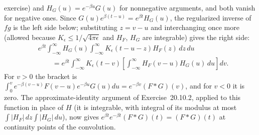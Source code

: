 exercise) and $H_G(u)=e^{-\beta u}G(u)$ for nonnegative
arguments, and both vanish for negative ones. Since
$G(u)e^{\beta(t-u)}=e^{\beta t}H_G(u)$, the regularized inverse
of $fg$ is the left side below; substituting $z=v-u$ and
interchanging once more (allowed because
$K_\epsilon\le1/\sqrt{4\pi\epsilon}$ and $H_F$, $H_G$ are
integrable) gives the right side:
\begin{align*}
&e^{\beta t}\int_{-\infty}^{\infty}H_G(u)\int_{-\infty}^{\infty}
K_\epsilon(t-u-z)H_F(z)\,dz\,du\\
&\qquad=e^{\beta t}\int_{-\infty}^{\infty}K_\epsilon(t-v)
\left[\int_{-\infty}^{\infty}H_F(v-u)H_G(u)\,du\right]dv.
\end{align*}
For $v>0$ the bracket is
$\int_0^ve^{-\beta(v-u)}F(v-u)e^{-\beta u}G(u)du
=e^{-\beta v}(F*G)(v)$, and for $v<0$ it is zero. The
approximate-identity argument of Exercise~20.10.2, applied to
this function in place of $H$ (it is integrable, with integral
of its modulus at most $\int|H_F|\,dz\int|H_G|\,du$), now gives
$e^{\beta t}e^{-\beta t}(F*G)(t)=(F*G)(t)$ at continuity
points of the convolution.

